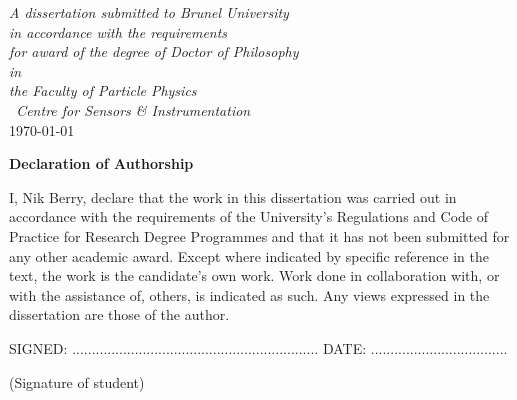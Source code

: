 \documentclass[oneside, a4paper, 11pt, ]{report}
\begin{document}
\begin{titlepage}
\begin{center}
\large \textit{ A dissertation submitted to Brunel University\\ in accordance with the requirements\\ for award of the degree of Doctor of Philosophy}\\[0.3cm] 
\textit{in}\\[0.4cm]
\textit{the Faculty of Particle Physics\\\ Centre for Sensors \& Instrumentation} \\

\vspace*{6mm}
{\large \today}\\[4cm]

\end{center}

\end{titlepage}

\pagestyle{empty}


\newpage

\begin{center}
 \begin{large}
\textbf{Declaration of Authorship}
\end{large}
\end{center}

\noindent I, Nik Berry, declare that the work in this dissertation was carried out in accordance with the requirements of the University's Regulations and Code of Practice for Research Degree Programmes and that it has not been submitted for any other academic award. Except where indicated by specific reference in the text, the work is the candidate's own work. Work done in collaboration with, or with the assistance of, others, is indicated as such. Any views expressed in the dissertation are those of the author.\\

\begin{center}
SIGNED: $...............................................................$  DATE: $...................................$

(Signature of student)

\vspace{12pt}
\end{center}
\null\vfill
\end{document}
